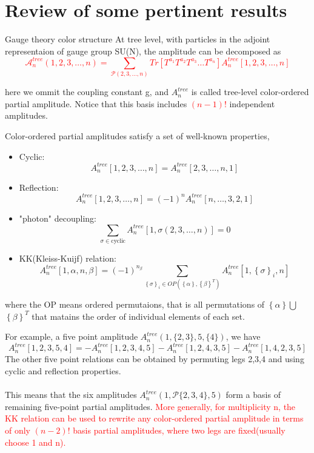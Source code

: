 \documentclass{beamer}
\begin{document}
\section{Review of some pertinent results}
\begin{frame}{Gauge theory color structure}
    At tree level, with particles in the adjoint representaion of gauge group SU(N), the amplitude can be 
decomposed as
\textcolor{red}{\begin{equation*}
    \mathcal{A}_n^{tree}(1,2,3,\dots,n)=\sum _{\mathcal{P}(2,3,\dots,n)}Tr[T^{a_1}T^{a_2}T^{a_3}\dots
    T^{a_n}]A_n^{tree}[1,2,3,\dots,n]
\end{equation*}}

here we ommit the coupling constant g, and $A_n^{tree}$ is called tree-level color-ordered partial amplitude.
Notice that this basis includes \textcolor{red}{$(n-1)!$} independent amplitudes.
\end{frame}
\begin{frame}
    Color-ordered partial amplitudes satisfy a set of well-known properties,
    \begin{itemize}
        \item Cyclic:\quad $$A_n^{tree}[1,2,3,\dots,n]=A_n^{tree}[2,3,\dots,n,1]$$
        \item Reflection: \quad $$A_n^{tree}[1,2,3,\dots,n]=(-1)^nA_n^{tree}[n,\dots,3,2,1]$$
        \item "photon" decoupling: \quad $$\sum_{\sigma\in \text{cyclic}}A_n^{tree}[1,\sigma(2,3,\dots,n)]=0$$
        \item KK(Kleiss-Kuijf) relation:\quad $$A_n^{tree}[1,{\alpha},n,{\beta}]=(-1)^{n_\beta}
        \sum_{\left\{\sigma\right\}_i\in OP(\left\{\alpha\right\},\left\{\beta\right\}^T)}A_n^{tree}[1,\left\{\sigma\right\}_i,n]$$
    \end{itemize}
    where the OP means ordered permutaions, that is all permutations of $\left\{\alpha\right\}$$\bigcup$$\left\{\beta\right\}^T$
    that matains the order of individual elements of each set.
\end{frame}
\begin{frame}
    For example, a five point amplitude $A_n^{tree}(1,\{2,3\},5,\{4\})$, we have
\begin{equation*}
    A_n^{tree}[1,2,3,5,4]=-A_n^{tree}[1,2,3,4,5]-A_n^{tree}[1,2,4,3,5]-A_n^{tree}[1,4,2,3,5]
\end{equation*}
The other five point relations can be obtained by permuting legs 2,3,4 and using cyclic and reflection properties.
\\ \hspace*{\fill}\\
This means that the six amplitudes $A_n^{tree}(1,\mathcal{P}\{2,3,4 \},5 )$ form a basis of remaining five-point partial amplitudes.
\textcolor{red}{More generally, for multiplicity n, the KK relation can be used to rewrite any color-ordered partial amplitude in terms of only $(n-2)!$
basis partial amplitudes, where two legs are fixed(usually choose 1 and n).}
\end{frame}
\end{document}
